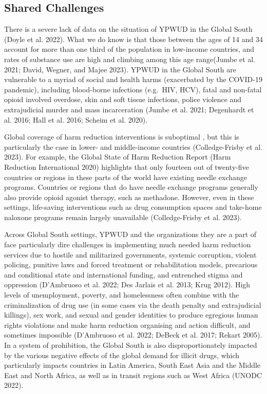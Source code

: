 \documentclass[
  letterpaper,
  DIV=11,
  numbers=noendperiod]{scrartcl}
\begin{document}
\subsection{Shared Challenges}\label{sec-challenges}

There is a severe lack of data on the situation of YPWUD in the Global
South (Doyle et al. 2022). What we do know is that those between the
ages of 14 and 34 account for more than one third of the population in
low-income countries, and rates of substance use are high and climbing
among this age range(Jumbe et al. 2021; David, Wegner, and Majee 2023).
YPWUD in the Global South are vulnerable to a myriad of social and
health harms (exacerbated by the COVID-19 pandemic), including
blood-borne infections (e.g.~HIV, HCV), fatal and non-fatal opioid
involved overdose, skin and soft tissue infections, police violence and
extrajudicial murder and mass incarceration (Jumbe et al. 2021;
Degenhardt et al. 2016; Hall et al. 2016; Scheim et al. 2020).

Global coverage of harm reduction interventions is suboptimal , but this
is particularly the case in lower- and middle-income countries
(Colledge-Frisby et al. 2023). For example, the Global State of Harm
Reduction Report (Harm Reduction International 2020) highlights that
only fourteen out of twenty-five countries or regions in these parts of
the world have existing needle exchange programs. Countries or regions
that do have needle exchange programs generally also provide opioid
agonist therapy, such as methadone. However, even in these settings,
life-saving interventions such as drug consumption spaces and take-home
naloxone programs remain largely unavailable (Colledge-Frisby et al.
2023).

Across Global South settings, YPWUD and the organizations they are a
part of face particularly dire challenges in implementing much needed
harm reduction services due to hostile and militarized governments,
systemic corruption, violent policing, punitive laws and forced
treatment or rehabilitation models, precarious and conditional state and
international funding, and entrenched stigma and oppression (D'Ambruoso
et al. 2022; Des Jarlais et al. 2013; Krug 2012). High levels of
unemployment, poverty, and homelessness often combine with the
criminalization of drug use (in some cases via the death penalty and
extrajudicial killings), sex work, and sexual and gender identities to
produce egregious human rights violations and make harm reduction
organising and action difficult, and sometimes impossible (D'Ambruoso et
al. 2022; DeBeck et al. 2017; Rekart 2005). In a system of prohibition,
the Global South is also disproportionately impacted by the various
negative effects of the global demand for illicit drugs, which
particularly impacts countries in Latin America, South East Asia and the
Middle East and North Africa, as well as in transit regions such as West
Africa (UNODC 2022).
\end{document}
